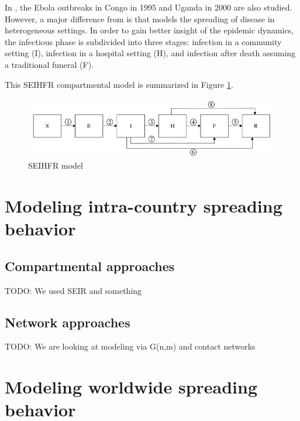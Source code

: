 \documentclass[10pt, journal,onecolumn]{IEEEtran}
\begin{document}
\label{SubSec:SEIHFR}

In \citep{legrand2007understanding}, the Ebola outbreaks in Congo in 1995 and Uganda in 2000
are also studied. However, a major difference from
\citep{chowell2004basic} is that \citep{legrand2007understanding} models the spreading of disease
in heterogeneous settings. In order to gain better insight of the epidemic dynamics,
the infectious phase is subdivided into three stages:
infection in a community setting (I), infection in a hospital setting (H), and
infection after death assuming a traditional funeral (F).

This SEIHFR compartmental model is summarized in Figure \ref{fig:SEIHFR_model}.

\begin{figure}[h!]
\centering
\includegraphics[scale=0.5]{seihfr_model_fig}
\caption{SEIHFR model}
\label{fig:SEIHFR_model}
\end{figure}




\section{Modeling intra-country spreading behavior}
\label{sec:IntraCountry}


\subsection{Compartmental approaches}
\label{sec:IntraCompartmental}

TODO: We used SEIR and something


\subsection{Network approaches}
\label{sec:IntraCompartmental}

TODO: We are looking at modeling via G(n,m) and contact networks

\section{Modeling worldwide spreading behavior}
\label{sec:InterCountry}
\end{document}
